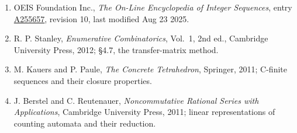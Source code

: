 \documentclass[11pt]{article}
\theoremstyle{definition}
\begin{document}
\begin{enumerate}

\item OEIS Foundation Inc., \emph{The On-Line Encyclopedia of Integer Sequences}, entry \href{https://oeis.org/A255657}{A255657}, revision 10, last modified Aug 23 2025.

\item R. P. Stanley, \emph{Enumerative Combinatorics}, Vol.~1, 2nd ed., Cambridge University Press, 2012; \S4.7, the transfer-matrix method.

\item M. Kauers and P. Paule, \emph{The Concrete Tetrahedron}, Springer, 2011; C-finite sequences and their closure properties.

\item J. Berstel and C. Reutenauer, \emph{Noncommutative Rational Series with Applications}, Cambridge University Press, 2011; linear representations of counting automata and their reduction.

\end{enumerate}
\end{document}
